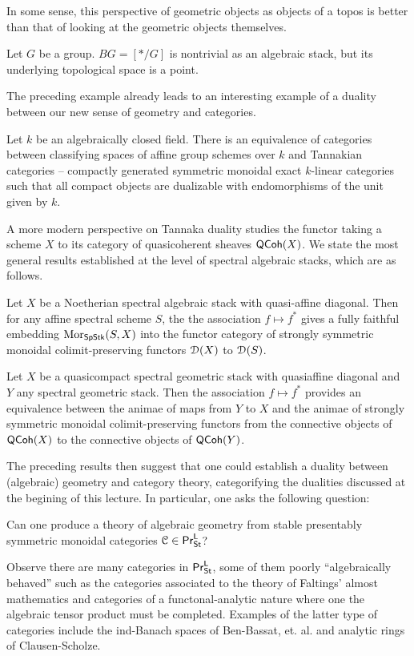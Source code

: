 In some sense, this perspective of geometric objects as objects of a topos is better than that of looking at the geometric objects themselves. 
\begin{example}\label{ex: BG}
    Let $G$ be a group. $BG=[*/G]$ is nontrivial as an algebraic stack, but its underlying topological space is a point. 
\end{example}
The preceding example already leads to an interesting example of a duality between our new sense of geometry and categories. 
\begin{example}\label{ex: Tannaka duality}
    Let $k$ be an algebraically closed field. There is an equivalence of categories between classifying spaces of affine group schemes over $k$ and Tannakian categories -- compactly generated symmetric monoidal exact $k$-linear categories such that all compact objects are dualizable with endomorphisms of the unit given by $k$. 
\end{example}
A more modern perspective on Tannaka duality studies the functor taking a scheme $X$ to its category of quasicoherent sheaves $\mathsf{QCoh}(X)$. We state the most general results established at the level of spectral algebraic stacks, which are as follows. 
\begin{theorem}\label{thm: Tannaka BHL}
    Let $X$ be a Noetherian spectral algebraic stack with quasi-affine diagonal. Then for any affine spectral scheme $S$, the the association $f\mapsto f^{*}$ gives a fully faithful embedding $\mathrm{Mor}_{\mathsf{SpStk}}(S,X)$ into the functor category of strongly symmetric monoidal colimit-preserving functors $\EuScript{D}(X)$ to $\EuScript{D}(S)$. 
\end{theorem}
\begin{theorem}
    Let $X$ be a quasicompact spectral geometric stack with quasiaffine diagonal and $Y$ any spectral geometric stack. Then the association $f\mapsto f^{*}$ provides an equivalence between the animae of maps from $Y$ to $X$ and the animae of strongly symmetric monoidal colimit-preserving functors from the connective objects of $\mathsf{QCoh}(X)$ to the connective objects of $\mathsf{QCoh}(Y)$. 
\end{theorem}

The preceding results then suggest that one could establish a duality between (algebraic) geometry and category theory, categorifying the dualities discussed at the begining of this lecture. In particular, one asks the following question:
\begin{question}
    Can one produce a theory of algebraic geometry from stable presentably symmetric monoidal categories $\EuScript{C}\in\mathsf{Pr}^{\mathsf{L}}_{\mathsf{St}}$? 
\end{question}
Observe there are many categories in $\mathsf{Pr}^{\mathsf{L}}_{\mathsf{St}}$, some of them poorly ``algebraically behaved'' such as the categories associated to the theory of Faltings' almost mathematics and categories of a functonal-analytic nature where one the algebraic tensor product must be completed. Examples of the latter type of categories include the ind-Banach spaces of Ben-Bassat, et. al. and analytic rings of Clausen-Scholze. 

